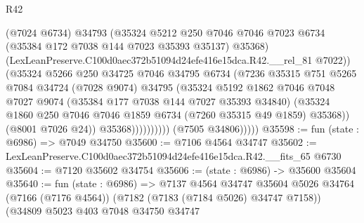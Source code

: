 \begin{lexlean}{R42}
\begin{coremodule}
{                                (@7024 @6734)
                                @34793
                                (@35324
                                  @5212
                                  @250
                                  @7046
                                  @7046
                                  @7023
                                  @6734
                                  (@35384 @172 @7038 @144 @7023 @35393 @35137)
                                  @35368)
                                (LexLeanPreserve.C100d0aec372b51094d24efe416e15dca.R42.__rel_81
                                  @7022))
                              (@35324
                                @5266
                                @250
                                @34725
                                @7046
                                @34795
                                @6734
                                (@7236
                                  @35315
                                  @751
                                  @5265
                                  @7084
                                  @34724
                                  (@7028 @9074)
                                  @34795
                                  (@35324
                                    @5192
                                    @1862
                                    @7046
                                    @7048
                                    @7027
                                    @9074
                                    (@35384 @177 @7038 @144 @7027 @35393 @34840)
                                    (@35324
                                      @1860
                                      @250
                                      @7046
                                      @7046
                                      @1859
                                      @6734
                                      (@7260 @35315 @49 @1859)
                                      @35368))
                                  (@8001 @7026 @24))
                                @35368))))))))))
            (@7505 @34806)))))
@35598 := fun (state : @6986) => @7049 @34750
@35600 := @7106 @4564 @34747
@35602 := LexLeanPreserve.C100d0aec372b51094d24efe416e15dca.R42.__fits_65 @6730
@35604 := @7120 @35602 @34754
@35606 := (state : @6986) -> @35600 @35604
@35640 := fun (state : @6986) =>
  @7137
    @4564
    @34747
    @35604
    @5026
    @34764
    (@7166 (@7176 @4564))
    (@7182 (@7183 (@7184 @5026) @34747 @7158))
    (@34809
      @5023
      @403
      @7048
      @34750
      @34747
}
\end{coremodule}
\end{lexlean}
